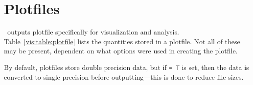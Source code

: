 \section{Plotfiles}

\maestro\ outputs plotfile specifically for visualization and analysis.
Table~\ref{vis:table:plotfile} lists the quantities stored in a plotfile.
Not all of these may be present, dependent on what options were used in 
creating the plotfile.

By default, plotfiles store double precision data, but if
 {\tt = T} is set, then the data is
converted to single precision before outputting---this is done to
reduce file sizes.

